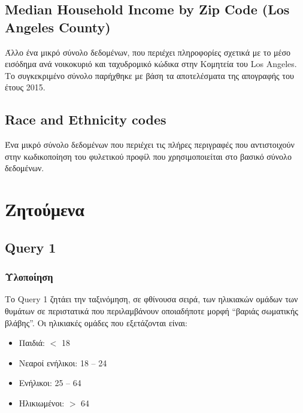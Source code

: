 \documentclass{article}
\begin{document}
\subsection{Median Household Income by Zip Code (Los Angeles County)}
Άλλο ένα μικρό σύνολο δεδομένων, που περιέχει πληροφορίες σχετικά με το μέσο εισόδημα ανά νοικοκυριό και ταχυδρομικό κώδικα στην Κομητεία του Los Angeles. Το συγκεκριμένο σύνολο παρήχθηκε με βάση τα αποτελέσματα της απογραφής του έτους 2015. 

\subsection{ Race and Ethnicity codes }
Ένα μικρό σύνολο δεδομένων που περιέχει τις πλήρες περιγραφές που
αντιστοιχούν στην κωδικοποίηση του φυλετικού προφίλ που χρησιμοποιείται στο βασικό σύνολο δεδομένων.

\section{ Ζητούμενα }
\subsection{Query 1}
\subsubsection*{Υλοποίηση}
Το Query 1 ζητάει την ταξινόμηση, σε φθίνουσα σειρά, των ηλικιακών ομάδων των θυμάτων σε περιστατικά που περιλαμβάνουν οποιαδήποτε μορφή “βαριάς σωματικής βλάβης”. Οι ηλικιακές ομάδες που εξετάζονται είναι:
\begin{itemize}
    \item Παιδιά: $<$ 18
    \item Νεαροί ενήλικοι: 18 – 24
    \item Ενήλικοι: 25 – 64
    \item Ηλικιωμένοι: $>$ 64
\end{itemize}
\end{document}
